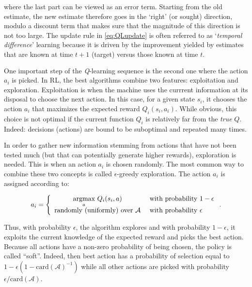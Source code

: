 \documentclass[]{krantz}
\theoremstyle{definition}
\theoremstyle{definition}
\theoremstyle{definition}
\theoremstyle{remark}
\begin{document}
where the last part can be viewed as an error term. Starting from the
old estimate, the new estimate therefore goes in the `right' (or sought)
direction, modulo a discount term that makes sure that the magnitude of
this direction is not too large. The update rule in \eqref{eq:QLupdate} is
often referred to as `\emph{temporal difference}' learning because it is
driven by the improvement yielded by estimates that are known at time
\(t+1\) (target) versus those known at time \(t\).

One important step of the \emph{Q}-learning sequence is the second one
where the action \(a_i\) is picked. In RL, the best algorithms combine
two features: exploitation and exploration. Exploitation is when the
machine uses the currrent information at its disposal to choose the next
action. In this case, for a given state \(s_i\), it chooses the action
\(a_i\) that maximizes the expected reward \(Q_i(s_i,a_i)\). While
obvious, this choice is not optimal if the current function \(Q_i\) is
relatively far from the \emph{true} \(Q\). Indeed: decisions (actions)
are bound to be suboptimal and repeated many times.

In order to gather new information stemming from actions that have not
been tested much (but that can potentially generate higher rewards),
exploration is needed. This is when an action \(a_i\) is chosen
randomly. The most common way to combine these two concepts is called
\(\epsilon\)-greedy exploration. The action \(a_i\) is assigned
according to:

\begin{equation}
\label{eq:egreedy}
a_i=\left\{ \begin{array}{c l}
\underset{a}{\text{argmax}} \ Q_i(s_i,a) & \text{ with probability } 1-\epsilon \\
\text{randomly (uniformly) over } \mathcal{A} & \text{ with probability } \epsilon
\end{array}\right. .
\end{equation}

Thus, with probability \(\epsilon\), the algorithm explores and with
probability \(1-\epsilon\), it exploits the current knowledge of the
expected reward and picks the best action. Because all actions have a
non-zero probability of being chosen, the policy is called ``soft''.
Indeed, then best action has a probability of selection equal to
\(1-\epsilon(1-\text{card}(\mathcal{A})^{-1})\) while all other actions
are picked with probability \(\epsilon/\text{card}(\mathcal{A})\).
\end{document}
